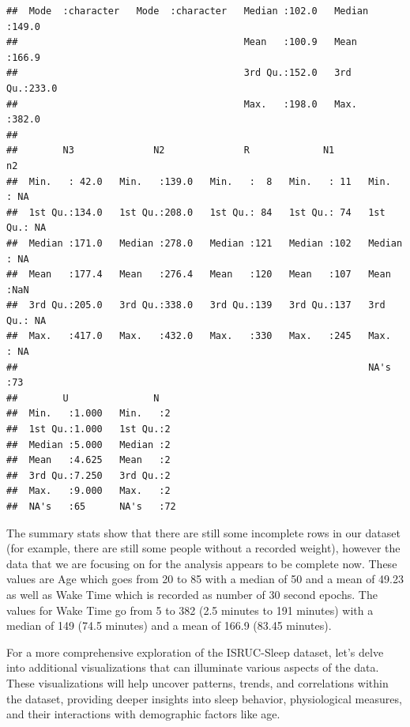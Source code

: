 \documentclass[
]{article}
\begin{document}
\begin{verbatim}
##  Mode  :character   Mode  :character   Median :102.0   Median :149.0  
##                                        Mean   :100.9   Mean   :166.9  
##                                        3rd Qu.:152.0   3rd Qu.:233.0  
##                                        Max.   :198.0   Max.   :382.0  
##                                                                       
##        N3              N2              R             N1            n2     
##  Min.   : 42.0   Min.   :139.0   Min.   :  8   Min.   : 11   Min.   : NA  
##  1st Qu.:134.0   1st Qu.:208.0   1st Qu.: 84   1st Qu.: 74   1st Qu.: NA  
##  Median :171.0   Median :278.0   Median :121   Median :102   Median : NA  
##  Mean   :177.4   Mean   :276.4   Mean   :120   Mean   :107   Mean   :NaN  
##  3rd Qu.:205.0   3rd Qu.:338.0   3rd Qu.:139   3rd Qu.:137   3rd Qu.: NA  
##  Max.   :417.0   Max.   :432.0   Max.   :330   Max.   :245   Max.   : NA  
##                                                              NA's   :73   
##        U               N     
##  Min.   :1.000   Min.   :2   
##  1st Qu.:1.000   1st Qu.:2   
##  Median :5.000   Median :2   
##  Mean   :4.625   Mean   :2   
##  3rd Qu.:7.250   3rd Qu.:2   
##  Max.   :9.000   Max.   :2   
##  NA's   :65      NA's   :72
\end{verbatim}

The summary stats show that there are still some incomplete rows in our
dataset (for example, there are still some people without a recorded
weight), however the data that we are focusing on for the analysis
appears to be complete now. These values are Age which goes from 20 to
85 with a median of 50 and a mean of 49.23 as well as Wake Time which is
recorded as number of 30 second epochs. The values for Wake Time go from
5 to 382 (2.5 minutes to 191 minutes) with a median of 149 (74.5
minutes) and a mean of 166.9 (83.45 minutes).

For a more comprehensive exploration of the ISRUC-Sleep dataset, let's
delve into additional visualizations that can illuminate various aspects
of the data. These visualizations will help uncover patterns, trends,
and correlations within the dataset, providing deeper insights into
sleep behavior, physiological measures, and their interactions with
demographic factors like age.
\end{document}
